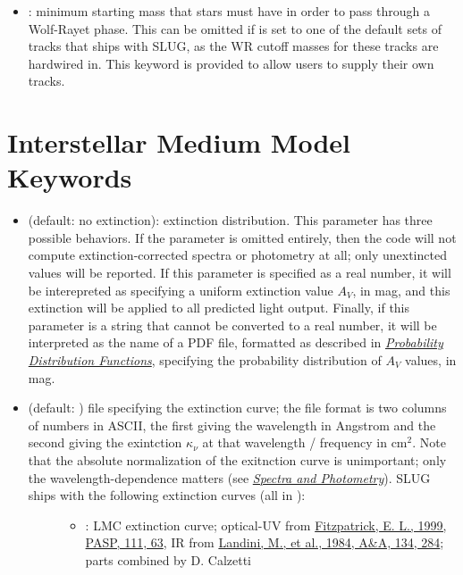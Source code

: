 \documentclass[letterpaper,10pt,english]{sphinxmanual}
\begin{document}
\begin{itemize}
\item {} 
: minimum starting mass that stars must have in order to pass through a Wolf-Rayet phase. This can be omitted if  is set to one of the default sets of tracks that ships with SLUG, as the WR cutoff masses for these tracks are hardwired in. This keyword is provided to allow users to supply their own tracks.

\end{itemize}


\section{Interstellar Medium Model Keywords}
\label{parameters:ssec-ism-keywords}\label{parameters:interstellar-medium-model-keywords}\begin{itemize}
\item {} 
 (default: no extinction): extinction distribution. This parameter has three possible behaviors. If the parameter  is omitted entirely, then the code will not compute extinction-corrected spectra or photometry at all; only unextincted values will be reported. If this parameter is specified as a real number, it will be interepreted as specifying a uniform extinction value \(A_V\), in mag, and this extinction will be applied to all predicted light output. Finally, if this parameter is a string that cannot be converted to a real number, it will be interpreted as the name of a PDF file, formatted as described in {\hyperref[pdfs:sec\string-pdfs]{\emph{Probability Distribution Functions}}}, specifying the probability distribution of \(A_V\) values, in mag.

\item {} \begin{description}
\item[{ (default: ) file specifying the extinction curve; the file format is two columns of numbers in ASCII, the first giving the wavelength in Angstrom and the second giving the exintction \(\kappa_\nu\) at that wavelength / frequency in \(\mathrm{cm}^2\). Note that the absolute normalization of the exitnction curve is unimportant; only the wavelength-dependence matters (see {\hyperref[intro:ssec\string-spec\string-phot]{\emph{Spectra and Photometry}}}). SLUG ships with the following extinction curves (all in ):}] \leavevmode\begin{itemize}
\item {} 
 : LMC extinction curve; optical-UV from \href{http://adsabs.harvard.edu/abs/1999PASP..111...63F}{Fitzpatrick, E. L., 1999, PASP, 111, 63}, IR from \href{http://adsabs.harvard.edu/abs/1984A\%26A...134..284L}{Landini, M., et al., 1984, A\&A, 134, 284}; parts combined by D. Calzetti


\end{itemize}
\end{description}
\end{itemize}
\end{document}

